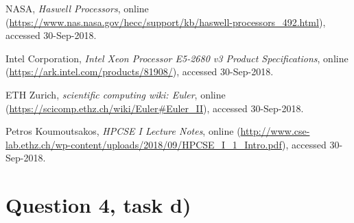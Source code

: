 \documentclass[11pt,a4paper]{article}
\begin{document}
\begin{thebibliography}{99}

	NASA,
 	\emph{Haswell Processors},
	online (\url{https://www.nas.nasa.gov/hecc/support/kb/haswell-processors_492.html}),
 	accessed 30-Sep-2018.
 
	Intel Corporation,
	\emph{Intel Xeon Processor E5-2680 v3 Product Specifications},
	online (\url{https://ark.intel.com/products/81908/}),
	accessed 30-Sep-2018.
	
	ETH Zurich,
 	\emph{scientific computing wiki: Euler},
	online (\url{https://scicomp.ethz.ch/wiki/Euler#Euler_II}),
 	accessed 30-Sep-2018.	

	Petros Koumoutsakos,
	\emph{HPCSE I Lecture Notes},
	online (\url{http://www.cse-lab.ethz.ch/wp-content/uploads/2018/09/HPCSE_I_1_Intro.pdf}),
	accessed 30-Sep-2018.

\end{thebibliography}


\appendix
\section{Question 4, task d)}\label{app}

\end{document}
